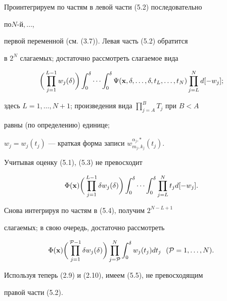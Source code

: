 \begin{pf}


Проинтегрируем по частям в левой части (5.2) последовательно


по\linebreak $N$-й$,\dotsc$,   %


первой переменной (см. (3.7)). Левая часть (5.2) обратится


в $2^N$ слагаемых; достаточно рассмотреть слагаемое вида


\begin{equation}


\bigg(\prod_{j=1}^{L-1}w_j (\delta)\bigg)


\int_0^\delta\dotsb\int_0^\delta


\Psi ({\bold x},\delta,\dotsc,\delta,t_L,\dotsc,t_N)


\prod_{j=L}^N d[-w_j];


\end{equation}


здесь $L=1,\dotsc,N+1$; произведения вида $\prod\limits_{j=A}^BT_j$ при $B<A$


равны (по определению) единице;


$w_j=w_j(t_j)$ --- краткая форма записи $w_{m_j,k_j}^{\alpha_j,*}(t_j)$.





Учитывая оценку (5.1), (5.3) не превосходит


\begin{equation}


\Phi ({\bold x})\bigg(\prod_{j=1}^{L-1}\delta w_j(\delta)\bigg)


\int_0^\delta\dotsb\int_0^\delta\prod_{j=L}^N t_j d[-w_j].


\end{equation}


Снова интегрируя по частям в (5.4), получим $2^{N-L+1}$


слагаемых; в свою очередь, достаточно  рассмотреть


\begin{equation}


\Phi ({\bold x})\bigg(\prod_{j=1}^{{\cal P} -1}\delta w_j(\delta)\bigg)


\prod_{j={\cal P}}^N \int_0^\delta w_j(t_j)d t_j\ \ ({\cal P}=1,\dotsc,N).


\end{equation}


Используя теперь (2.9) и (2.10), имеем (5.5), не превосходящим


правой части (5.2).


\end{pf}





